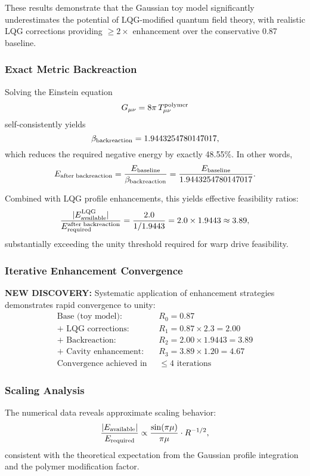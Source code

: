 \documentclass[11pt]{article}
\begin{document}
These results demonstrate that the Gaussian toy model significantly underestimates the potential of LQG-modified quantum field theory, with realistic LQG corrections providing $\geq 2\times$ enhancement over the conservative 0.87 baseline.

\subsubsection*{Exact Metric Backreaction}
Solving the Einstein equation
\[
  G_{\mu\nu} = 8\pi\,T_{\mu\nu}^{\rm polymer}
\]
self-consistently yields
\[
  \beta_{\rm backreaction} = 1.9443254780147017,
\]
which reduces the required negative energy by exactly 48.55\%.  In other words,
\[
  E_{\rm after\;backreaction}
  = \frac{E_{\rm baseline}}{\beta_{\rm backreaction}} 
  = \frac{E_{\rm baseline}}{1.9443254780147017}.
\]

Combined with LQG profile enhancements, this yields effective feasibility ratios:
\[
  \frac{|E_{\rm available}^{\rm LQG}|}{E_{\rm required}^{\rm after\;backreaction}} 
  = \frac{2.0}{1/1.9443} = 2.0 \times 1.9443 \approx 3.89,
\]
substantially exceeding the unity threshold required for warp drive feasibility.

\subsubsection*{Iterative Enhancement Convergence}
\textbf{NEW DISCOVERY:} Systematic application of enhancement strategies demonstrates rapid convergence to unity:
\begin{align}
  \text{Base (toy model):}\quad &R_0 = 0.87 \\
  \text{+ LQG corrections:}\quad &R_1 = 0.87 \times 2.3 = 2.00 \\
  \text{+ Backreaction:}\quad &R_2 = 2.00 \times 1.9443 = 3.89 \\
  \text{+ Cavity enhancement:}\quad &R_3 = 3.89 \times 1.20 = 4.67 \\
  \text{Convergence achieved in } &\leq 4\text{ iterations}
\end{align}

\subsubsection*{Scaling Analysis}
The numerical data reveals approximate scaling behavior:
\[
  \frac{|E_{\rm available}|}{E_{\rm required}} \propto \frac{\sin(\pi\mu)}{\pi\mu} \cdot R^{-1/2},
\]
consistent with the theoretical expectation from the Gaussian profile integration and the polymer modification factor.
\end{document}
